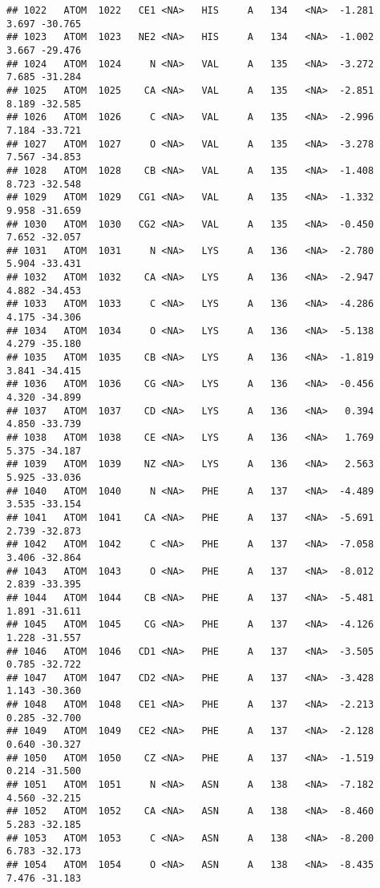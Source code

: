 \documentclass[
]{article}
\begin{document}
\begin{verbatim}
## 1022   ATOM  1022   CE1 <NA>   HIS     A   134   <NA>  -1.281   3.697 -30.765
## 1023   ATOM  1023   NE2 <NA>   HIS     A   134   <NA>  -1.002   3.667 -29.476
## 1024   ATOM  1024     N <NA>   VAL     A   135   <NA>  -3.272   7.685 -31.284
## 1025   ATOM  1025    CA <NA>   VAL     A   135   <NA>  -2.851   8.189 -32.585
## 1026   ATOM  1026     C <NA>   VAL     A   135   <NA>  -2.996   7.184 -33.721
## 1027   ATOM  1027     O <NA>   VAL     A   135   <NA>  -3.278   7.567 -34.853
## 1028   ATOM  1028    CB <NA>   VAL     A   135   <NA>  -1.408   8.723 -32.548
## 1029   ATOM  1029   CG1 <NA>   VAL     A   135   <NA>  -1.332   9.958 -31.659
## 1030   ATOM  1030   CG2 <NA>   VAL     A   135   <NA>  -0.450   7.652 -32.057
## 1031   ATOM  1031     N <NA>   LYS     A   136   <NA>  -2.780   5.904 -33.431
## 1032   ATOM  1032    CA <NA>   LYS     A   136   <NA>  -2.947   4.882 -34.453
## 1033   ATOM  1033     C <NA>   LYS     A   136   <NA>  -4.286   4.175 -34.306
## 1034   ATOM  1034     O <NA>   LYS     A   136   <NA>  -5.138   4.279 -35.180
## 1035   ATOM  1035    CB <NA>   LYS     A   136   <NA>  -1.819   3.841 -34.415
## 1036   ATOM  1036    CG <NA>   LYS     A   136   <NA>  -0.456   4.320 -34.899
## 1037   ATOM  1037    CD <NA>   LYS     A   136   <NA>   0.394   4.850 -33.739
## 1038   ATOM  1038    CE <NA>   LYS     A   136   <NA>   1.769   5.375 -34.187
## 1039   ATOM  1039    NZ <NA>   LYS     A   136   <NA>   2.563   5.925 -33.036
## 1040   ATOM  1040     N <NA>   PHE     A   137   <NA>  -4.489   3.535 -33.154
## 1041   ATOM  1041    CA <NA>   PHE     A   137   <NA>  -5.691   2.739 -32.873
## 1042   ATOM  1042     C <NA>   PHE     A   137   <NA>  -7.058   3.406 -32.864
## 1043   ATOM  1043     O <NA>   PHE     A   137   <NA>  -8.012   2.839 -33.395
## 1044   ATOM  1044    CB <NA>   PHE     A   137   <NA>  -5.481   1.891 -31.611
## 1045   ATOM  1045    CG <NA>   PHE     A   137   <NA>  -4.126   1.228 -31.557
## 1046   ATOM  1046   CD1 <NA>   PHE     A   137   <NA>  -3.505   0.785 -32.722
## 1047   ATOM  1047   CD2 <NA>   PHE     A   137   <NA>  -3.428   1.143 -30.360
## 1048   ATOM  1048   CE1 <NA>   PHE     A   137   <NA>  -2.213   0.285 -32.700
## 1049   ATOM  1049   CE2 <NA>   PHE     A   137   <NA>  -2.128   0.640 -30.327
## 1050   ATOM  1050    CZ <NA>   PHE     A   137   <NA>  -1.519   0.214 -31.500
## 1051   ATOM  1051     N <NA>   ASN     A   138   <NA>  -7.182   4.560 -32.215
## 1052   ATOM  1052    CA <NA>   ASN     A   138   <NA>  -8.460   5.283 -32.185
## 1053   ATOM  1053     C <NA>   ASN     A   138   <NA>  -8.200   6.783 -32.173
## 1054   ATOM  1054     O <NA>   ASN     A   138   <NA>  -8.435   7.476 -31.183

\end{verbatim}
\end{document}
